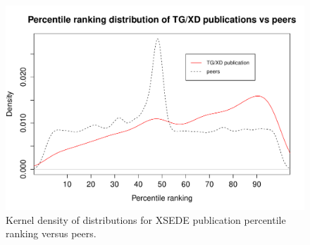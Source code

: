 \documentclass[10pt, conference, compsocconf]{IEEEtran}
\begin{document}
\begin{figure}[htb!]
  \centering 
    \includegraphics[width=1.0\columnwidth]{images-new/xd_peers_density.pdf} 
  \caption{Kernel density of distributions for XSEDE publication percentile ranking versus peers.}\label{F:xd_peers_density} 


\end{figure}
\end{document}
